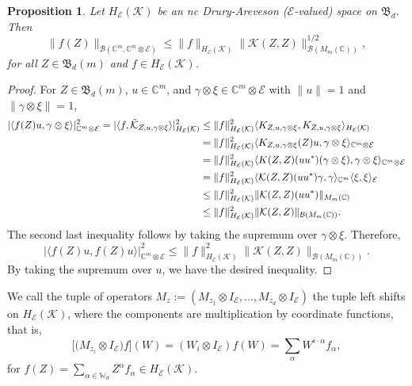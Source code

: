 \documentclass[12pt]{amsart}%
\newtheorem{proposition}[theorem]{Proposition}
\numberwithin{equation}{section}
\newcommand{\fB}{{\mathfrak{B}}}
\newcommand{\clb}{\mathcal{B}}
\newcommand{\cle}{\mathcal{E}}
\newcommand{\clk}{\mathcal{K}}
\newcommand{\C}{\mathbb{C}}
\newcommand\la{{\langle }}
\newcommand\ra{{\rangle}}
\begin{document}
\begin{proposition}\label{inequ_elem}
Let $H_\cle(\clk)$ be an nc Drury-Areveson ($\cle$-valued) space on $\fB_d$. Then 
\[\|f(Z)\|_{\clb(\C^m, \C^m\otimes\cle )}\leq \|f\|_{H_\cle(\clk)} \|\clk(Z,Z)\|^{1/2}_{\clb (M_{m}(\C))},\]
for all $Z\in \fB_d(m)$ and  $f\in H_\cle(\clk)$.
\end{proposition}
\begin{proof}
For $Z\in\fB_d(m)$, $u\in \C^m$, and $\gamma \otimes \xi \in \C^m\otimes \cle$ with $\|u\|=1$ and $\|\gamma\otimes \xi\|=1$,
\begin{align*}
|\la f(Z)u, \gamma\otimes \xi  \ra|_{\C^m \otimes \cle}^2=|\la f, \Tilde{\clk}_{Z, u, \gamma\otimes \xi} \ra|_{H_\cle(\clk)}^2 & \leq \|f\|_{H_\cle(\clk)}^2 \langle K_{Z, u, \gamma\otimes \xi} , K_{Z, u, \gamma\otimes \xi} \rangle_{H_\cle(\clk)}\\
&= \|f\|_{H_\cle(\clk)}^2 \langle K_{Z, u, \gamma\otimes \xi}(Z)u, \gamma\otimes \xi\rangle_{\C^m \otimes \cle}\\ 
&=\|f\|_{H_\cle(\clk)}^2\langle K(Z,Z)(uu^*)(\gamma\otimes \xi),\gamma\otimes \xi\rangle_{\C^m \otimes \cle}\\
&=\|f\|_{H_\cle(\clk)}^2\langle \clk(Z,Z)(uu^*)\gamma, \gamma \rangle_{\C^m} \langle \xi, \xi \rangle_\cle\\
&\leq \|f\|_{H_\cle(\clk)}^2 \|\clk(Z,Z)(u u^*)\|_{M_{m}(\C)}\\
&\leq \|f\|_{H_\cle(\clk)}^2 \|\clk(Z,Z)\|_{\clb (M_{m}(\C))}.
\end{align*}
The second last inequality follows by taking the supremum over $\gamma\otimes \xi$. Therefore, \[|\la f(Z)u, f(Z)u \ra|_{\C^m \otimes \cle}^2\leq \|f\|_{H_\cle(\clk)}^2 \|\clk(Z,Z)\|_{\clb (M_{m}(\C))}.\]
By taking the supremum over $u$, we have the desired inequality.
\end{proof}




We call the tuple of operators $M_z:=(M_{z_1} \otimes I_{\cle}, \ldots, M_{z_d}\otimes I_\cle)$ the tuple left shifts on $H_\cle(\clk)$, where the components are multiplication by coordinate functions, that is,  
\[
\big[\big(M_{z_i} \otimes I_{\cle} \big)f\big](W)= (W_i\otimes I_{\cle}) f(W)=\sum_{\alpha} W^{i\cdot \alpha}  f_\alpha,
\]
for $f(Z)=\sum_{\alpha\in \mathbb{W}_d} Z^\alpha f_\alpha\in H_\cle(\clk)$.
\end{document}
